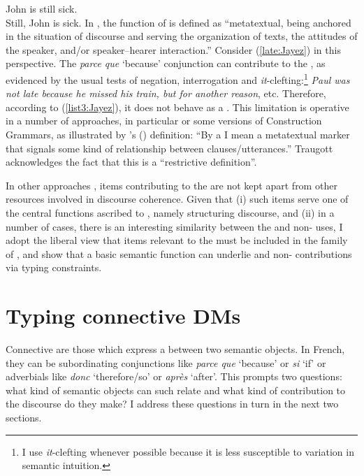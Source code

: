\documentclass[output=paper,colorlinks,citecolor=brown]{langscibook}
\begin{document}
\ea \label{ex:sick:Jayez}
\ea \label{ex:still-sick:Jayez}
John is still sick.\\
\ex \label{ex:is-sick:Jayez}
Still, John is sick.
\z
\z
\largerpage
\noindent In \citet[6]{Heineetal:2021}, the function of  is defined as ``metatextual, being anchored in the situation of discourse and serving the organization of texts, the attitudes of the speaker, and/or speaker–hearer interaction.'' Consider (\ref{late:Jayez}) in this perspective. The \textit{parce que} `because' conjunction can contribute to the , as evidenced by the usual tests of negation, interrogation and \textit{it}-clefting:\footnote{I use \textit{it}-clefting whenever possible because it is less susceptible to variation in semantic intuition.} \textit{Paul was not late because he missed his train, but for another reason}, etc. Therefore, according to (\ref{list3:Jayez}), it does not behave as a . This limitation is operative in a number of approaches, in particular  \citep{Heine:2013,Heineetal:2021} or some versions of Construction Grammars, as illustrated by \citeauthor{Traugott:2018}'s (\citeyear[27]{Traugott:2018}) definition: ``By a  I mean a metatextual marker that signals some kind of relationship between clauses/utterances.'' Traugott acknowledges the fact that this is a ``restrictive definition''.

In other approaches \citep[e.g.,][]{Webberetal:2017}, items contributing to the  are not kept apart from other resources involved in discourse coherence. Given that (i) such items serve one of the central functions ascribed to , namely structuring discourse, and (ii) in a number of cases, there is an interesting similarity between the  and non- uses, I adopt the liberal view that items relevant to the  must be included in the family of , and show that a basic semantic function can underlie  and non- contributions via typing constraints.

\section{Typing connective DMs}

\label{sec-connective-DM:Jayez}

Connective  are those  which express a  between two semantic objects. In French, they can be subordinating conjunctions like \textit{parce que} `because' or \textit{si} `if' or adverbials like \textit{donc} `therefore/so' or \textit{après} `after'. This prompts two questions: what kind of semantic objects can such  relate and what kind of contribution to the discourse do they make? I address these questions in turn in the next two sections.
\end{document}
